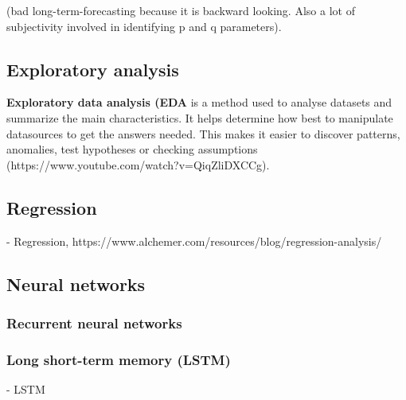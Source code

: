 (bad long-term-forecasting because it is backward looking. Also a lot of subjectivity involved in identifying p and q parameters). 


\subsection{Exploratory analysis}
\textbf{Exploratory data analysis (EDA} is a method used to analyse datasets and summarize the main characteristics. It helps determine how best to manipulate datasources to get the answers needed. This makes it easier to discover patterns, anomalies, test hypotheses or checking assumptions (https://www.youtube.com/watch?v=QiqZliDXCCg).   

\subsection{Regression}
- Regression, https://www.alchemer.com/resources/blog/regression-analysis/\\ 

\subsection{Neural networks}
\subsubsection{Recurrent neural networks}


\subsubsection{Long short-term memory (LSTM)}
- LSTM\\
